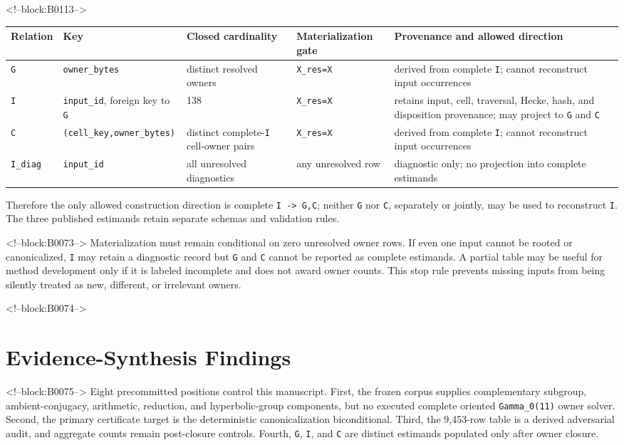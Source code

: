 \documentclass[11pt]{article}
\begin{document}
<!--block:B0113-->
\begin{center}
\scriptsize
\begin{tabular}{@{}p{.10\linewidth}p{.20\linewidth}p{.10\linewidth}p{.18\linewidth}p{.30\linewidth}@{}}
\toprule
Relation & Key & Closed cardinality & Materialization gate & Provenance and allowed direction \\
\midrule
\texttt{G} & \texttt{owner\_bytes} & distinct resolved owners & \texttt{X\_res=X} & derived from complete \texttt{I}; cannot reconstruct input occurrences \\
\texttt{I} & \texttt{input\_id}, foreign key to \texttt{G} & 138 & \texttt{X\_res=X} & retains input, cell, traversal, Hecke, hash, and disposition provenance; may project to \texttt{G} and \texttt{C} \\
\texttt{C} & \texttt{(cell\_key,owner\_bytes)} & distinct complete-\texttt{I} cell-owner pairs & \texttt{X\_res=X} & derived from complete \texttt{I}; cannot reconstruct input occurrences \\
\texttt{I\_diag} & \texttt{input\_id} & all unresolved diagnostics & any unresolved row & diagnostic only; no projection into complete estimands \\
\bottomrule
\end{tabular}
\end{center}
Therefore the only allowed construction direction is complete
\texttt{I -> G,C}; neither \texttt{G} nor \texttt{C}, separately or jointly,
may be used to reconstruct \texttt{I}.  The three published estimands retain
separate schemas and validation rules.

<!--block:B0073-->
Materialization must remain conditional on zero unresolved owner rows.
If even one input cannot be rooted or canonicalized, \texttt{I} may
retain a diagnostic record but \texttt{G} and \texttt{C} cannot be
reported as complete estimands. A partial table may be useful for method
development only if it is labeled incomplete and does not award owner
counts. This stop rule prevents missing inputs from being silently
treated as new, different, or irrelevant owners.

<!--block:B0074-->
\hypertarget{5-evidence-synthesis-findings}{%
\section{Evidence-Synthesis
Findings}\label{5-evidence-synthesis-findings}}

<!--block:B0075-->
Eight precommitted positions control this manuscript. First, the frozen
corpus supplies complementary subgroup, ambient-conjugacy, arithmetic,
reduction, and hyperbolic-group components, but no executed complete
oriented \texttt{Gamma\_0(11)} owner solver. Second, the primary
certificate target is the deterministic canonicalization biconditional.
Third, the 9,453-row table is a derived adversarial audit, and aggregate
counts remain post-closure controls. Fourth, \texttt{G}, \texttt{I}, and
\texttt{C} are distinct estimands populated only after owner closure.
\end{document}
